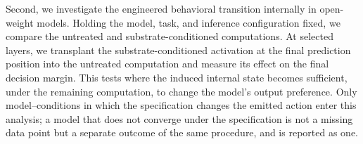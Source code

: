 Second, we investigate the engineered behavioral transition internally
in open-weight models. Holding the model, task, and inference
configuration fixed, we compare the untreated and substrate-conditioned
computations. At selected layers, we transplant the substrate-conditioned
activation at the final prediction position into the untreated
computation and measure its effect on the final decision margin.
This tests where the induced internal state becomes sufficient,
under the remaining computation, to change the model's output
preference. Only model--conditions in which the specification changes the emitted
action enter this analysis; a model that does not converge under the specification
is not a missing data point but a separate outcome of the same procedure, and is
reported as one.
